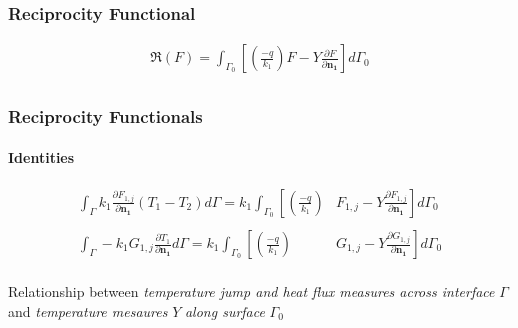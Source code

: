 \documentclass{beamer}
\begin{document}
%
\begin{frame}
	\frametitle{Reciprocity Functional}
	\begin{definition}{}
		\begin{align*}
		\Re(F) = \int_{\Gamma_0}\left[\left(\frac{-q}{k_1}\right)F - Y\frac{\partial F}{\partial\mathbf{n_1}}\right]d\Gamma_0 \\
		\end{align*}
	\end{definition}
	
	\begin{center}
	\end{center}
	
	\begin{center}
	\end{center}	
\end{frame}
%
\begin{frame}
	\label{slide_fr}
	\frametitle{Reciprocity Functionals}
	\framesubtitle{Identities}
	
	\begin{alertblock}{}
		\begin{align*}
		\int_\Gamma k_1 \frac{\partial F_{1,j}}{\partial\mathbf{n_1}}\left(T_1 - T_2\right)d\Gamma
		=
		k_1\int_{\Gamma_0}\left[\left(\frac{-q}{k_1}\right)\right. & \left.F_{1,j} - Y\frac{\partial F_{1,j}}{\partial\mathbf{n_1}}\right]d\Gamma_0
		\label{identidade_T} \\ \nonumber \\
		\int_\Gamma -k_1 G_{1,j} \frac{\partial T_1}{\partial\mathbf{n_1}}d\Gamma
		=
		k_1\int_{\Gamma_0}\left[\left(\frac{-q}{k_1}\right)\right. & \left.G_{1,j} -  Y\frac{\partial G_{1,j}}{\partial\mathbf{n_1}}\right]d\Gamma_0 \\
		\end{align*}
	\end{alertblock}
	
	\begin{center}
	\end{center}
	
	\begin{alertblock}{}
		Relationship between \textit{temperature jump and heat flux measures across interface} $\Gamma$
		and \textit{temperature mesaures} $Y$ \textit{along surface} $\Gamma_0$
	\end{alertblock}
	\hyperlink{slide_produto_interno}{\beamergotobutton{}}
\end{frame}
\end{document}
